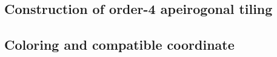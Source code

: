 
\subsection{Construction of order-4 apeirogonal tiling}\label{sec:tiling}

\subsection{Coloring and compatible coordinate}\label{sec:coloring}
